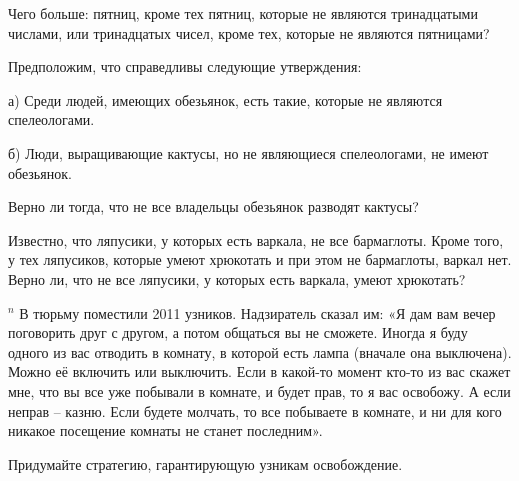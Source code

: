 \begin{thm}
    Чего больше: пятниц, кроме тех пятниц, которые не являются тринадцатыми числами, или тринадцатых чисел, кроме тех, которые не являются пятницами?
\end{thm}

\begin{thm}
    Предположим, что справедливы следующие утверждения:
    \par
    а) Среди людей, имеющих обезьянок, есть такие, которые не являются спелеологами.
    \par
    б) Люди, выращивающие кактусы, но не являющиеся спелеологами, не имеют обезьянок.
    \par
    Верно ли тогда, что не все владельцы обезьянок разводят кактусы?
\end{thm}

\begin{thm}
    Известно, что ляпусики, у которых есть варкала, не все бармаглоты. Кроме того, у тех ляпусиков, которые умеют хрюкотать и при этом не бармаглоты, варкал нет. Верно ли, что не все ляпусики, у которых есть варкала, умеют хрюкотать?
\end{thm}

\begin{thm} $^n$
    В тюрьму поместили 2011 узников. Надзиратель сказал им: «Я дам вам вечер поговорить друг с другом, а потом общаться вы не сможете. Иногда я буду одного из вас отводить в комнату, в которой есть лампа (вначале она выключена). Можно её включить или выключить. Если в какой-то момент кто-то из вас скажет мне, что вы все уже побывали в комнате, и будет прав, то я вас освобожу. А если неправ – казню. Если будете молчать, то все побываете в комнате, и ни для кого никакое посещение комнаты не станет последним». 
    \par
    Придумайте стратегию, гарантирующую узникам освобождение.
\end{thm}

